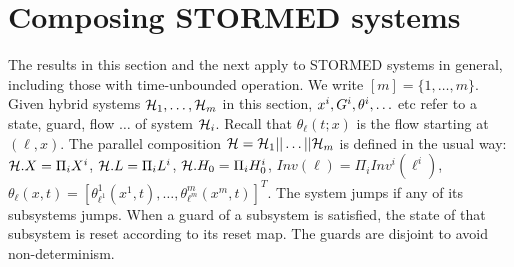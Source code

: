 \section{Composing STORMED systems}
\label{sec:compositionality}
The results in this section and the next apply to STORMED systems in general, including those with time-unbounded operation.
We write $[m] = \{1,\ldots,m\}$.
Given hybrid systems $\mathcal{H}_1,\ldots,\mathcal{H}_m$ in this section, $x^i, G^i, \theta^i,\ldots$ etc refer to a state, guard, flow $\ldots$ of system $\mathcal{H}_i$.
%
Recall that $\theta_{\ell}(t;x)$ is the flow starting at $(\ell,x)$.
The parallel composition $\mathcal{H} = \mathcal{H}_1 || \ldots ||\mathcal{H}_m$ is defined in the usual way:
$\mathcal{H}.X = \Pi_i X^i$,
$\mathcal{H}.L = \Pi_i L^i$,
$\mathcal{H}.H_0 =\Pi_i H_0^i$,
$Inv(\ell) = \Pi_{i}Inv^i(\ell^i)$,
$\theta_{\ell}(x,t)= [\theta_{\ell^1}^1(x^1,t),\ldots,\theta_{\ell^m}^m(x^m,t) ]^T$.
The system jumps if any of its subsystems jumps.
When a guard of a subsystem is satisfied, the state of that subsystem is reset according to its reset map.
The guards are disjoint to avoid non-determinism.

